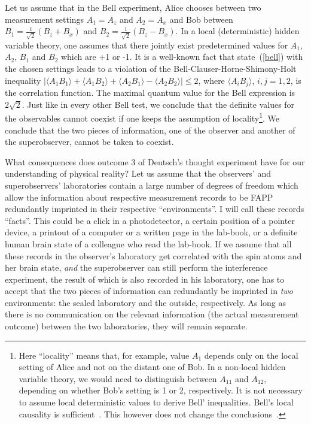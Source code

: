 \documentclass[12pt,a4]{article}
\begin{document}
Let us assume that in the Bell experiment, Alice chooses between two measurement settings $A_1=A_z$ and $A_2= A_x$ and Bob between $B_1= \frac{1}{\sqrt{2}} (B_z + B_x)$ and $B_2 =\frac{1}{\sqrt{2}} (B_z - B_x)$. In a local (deterministic) hidden variable theory, one assumes that there jointly exist predetermined values for $A_1$, $A_2$, $B_1$ and $B_2$ which are +1 or -1.  It is a well-known fact that state~(\ref{bell}) with the chosen settings leads to a violation of the Bell-Clauser-Horne-Shimony-Holt inequality $|\langle A_1 B_1 \rangle + \langle A_1 B_2 \rangle + \langle A_2 B_1 \rangle - \langle A_2 B_2 \rangle| \leq 2$, where 
$\langle A_i B_j \rangle$, $i,j=1,2$, is the correlation function. The maximal quantum value for the Bell expression is $2\sqrt{2}$. Just like in every other Bell test, we conclude that the definite values for the observables cannot coexist if one keeps the assumption of locality\footnote{Here ``locality'' means that, for example, value $A_1$ depends only on the local setting of Alice and not on the distant one of Bob. In a non-local hidden variable theory, we would need to distinguish between $A_{11}$ and $A_{12}$, depending on whether Bob's setting is 1 or 2, respectively. It is not necessary to assume local deterministic values to derive Bell' inequalities. Bell's local causality is sufficient~\cite{bell}. This however does not change the conclusions~\cite{marek}.}. We conclude that the two pieces of information, one of the observer and another of the superobserver, cannot be taken to coexist. 

What consequences does outcome 3 of Deutsch's thought experiment have for our understanding of physical reality? Let us assume that the observers' and superobservers' laboratories contain a large number of degrees of freedom which allow the information about respective measurement records  to be FAPP redundantly imprinted in their respective ``environments''. I will call these records ``facts''. This could be a click in a photodetector, a certain position of a pointer device, a printout of a computer or a written page in the lab-book, or a definite human brain state of a colleague who read the lab-book. If we assume that all these records in the observer's laboratory get correlated with the spin atoms and her brain state, {\it and} the superobserver can still perform the interference experiment, the result of which is also recorded in his laboratory, one has to accept that the two pieces of information can redundantly be imprinted in {\it two} environments: the sealed laboratory and the outside, respectively.  As long as there is no communication on the relevant information (the actual measurement outcome) between the two laboratories, they will remain separate. 
\end{document}
